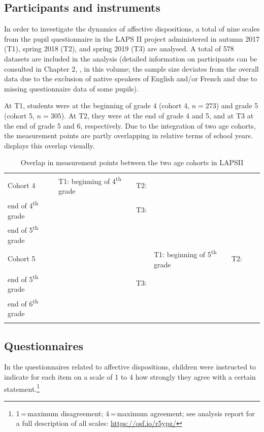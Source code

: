 \documentclass[output=paper]{langsci/langscibook}
\begin{document}
\subsection{Participants and instruments}

In order to investigate the dynamics of affective dispositions, a total of nine scales from the pupil questionnaire in the LAPS II project administered in autumn 2017 (T1), spring 2018 (T2), and spring 2019 (T3) are analysed. A total of 578 datasets are included in the analysis (detailed information on participants can be consulted in Chapter 2, , in this volume; the sample size deviates from the overall data due to the exclusion of native speakers of English and/or French and due to missing questionnaire data of some pupils). 

At T1, students were at the beginning of grade 4 (cohort 4, $n=273$) and grade 5 (cohort 5, $n=305$). At T2, they were at the end of grade 4 and 5, and at T3 at the end of grade 5 and 6, respectively. Due to the integration of two age cohorts, the measurement points are partly overlapping in relative terms of school years.  displays this overlap visually.

\begin{table}
\begin{tabular}{lllllll}
\lsptoprule
Cohort 4 & T1: beginning of 4\textsuperscript{th} grade & T2: \\
end of 4\textsuperscript{th} grade &  & T3: \\
end of 5\textsuperscript{th} grade &  & \\
Cohort 5 &  &  & T1: beginning of 5\textsuperscript{th} grade & T2: \\
end of 5\textsuperscript{th} grade &  & T3: \\
end of 6\textsuperscript{th} grade\\
\lspbottomrule
\end{tabular}
\caption{\label{bkm:Ref32572945}\label{tab:08:1}Overlap in measurement points between the two age cohorts in LAPSII}
\end{table}

\subsection{Questionnaires}

In the questionnaires related to affective dispositions, children were instructed to indicate for each item on a scale of 1 to 4 how strongly they agree with a certain statement.\footnote{1\,=\,maximum disagreement; 4\,=\,maximum agreement; see analysis report for a full description of all scales: \url{https://osf.io/r5ypz/}}
\end{document}
